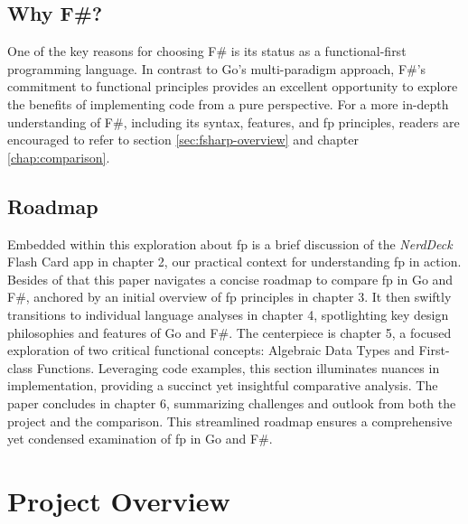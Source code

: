     \section{Why F\#?}\label{sec:whyfsharp}
    One of the key reasons for choosing F\# is its status as a functional-first programming language. In contrast to Go's multi-paradigm approach, F\#'s commitment to functional principles provides an excellent opportunity to explore the benefits of implementing code from a pure perspective.
    For a more in-depth understanding of F\#, including its syntax, features, and \ac{fp} principles, readers are encouraged to refer to section \ref{sec:fsharp-overview} and chapter \ref{chap:comparison}.

    \section{Roadmap}\label{sec:roadmap}
    Embedded within this exploration about \ac{fp} is a brief discussion of the \textit{NerdDeck} Flash Card \ac{app} in chapter 2, our practical context for understanding \ac{fp} in action. Besides of that this paper navigates a concise roadmap to compare \ac{fp} in Go and F\#, anchored by an initial overview of \ac{fp} principles in chapter 3. It then swiftly transitions to individual language analyses in chapter 4, spotlighting key design philosophies and features of Go and F\#. The centerpiece is chapter 5, a focused exploration of two critical functional concepts: Algebraic Data Types and First-class Functions. Leveraging code examples, this section illuminates nuances in implementation, providing a succinct yet insightful comparative analysis. The paper concludes in chapter 6, summarizing challenges and outlook from both the project and the comparison. This streamlined roadmap ensures a comprehensive yet condensed examination of \ac{fp} in Go and F\#.

\chapter{Project Overview}\label{chap:project-overview}
